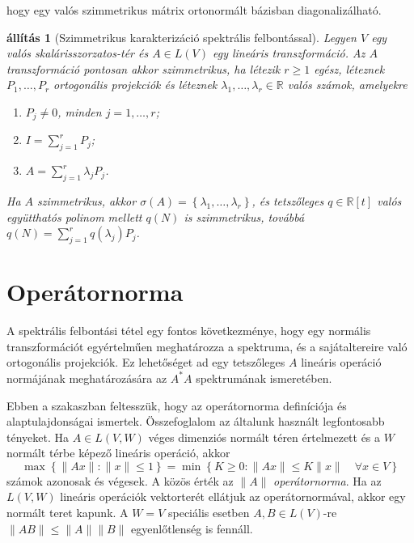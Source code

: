 \documentclass[9pt, a4paper, showtrims]{memoir}
\theoremstyle{plain}
\newtheorem{proposition}{állítás}[chapter]
\theoremstyle{remark}
\theoremstyle{definition}
\begin{document}
hogy egy valós szimmetrikus mátrix ortonormált bázisban diagonalizálható.
\begin{proposition}[Szimmetrikus karakterizáció spektrális felbontással]
    Legyen $V$ egy valós ska\-lá\-ris\-szor\-za\-tos-tér 
    és $A\in L\left( V \right)$ egy lineáris transzformáció.
    Az $A$ transzformáció pontosan akkor szimmetrikus,
    ha létezik $r\geq 1$ egész, léteznek $P_1,\dots,P_r$ ortogonális projekciók és
    léteznek $\lambda_1,\dots,\lambda_r\in\mathbb{R}$ valós számok,
    amelyekre
    \begin{enumerate}
        \item $P_j\neq 0$, minden $j=1,\dots,r$;
        \item $I=\sum_{j=1}^rP_j$;
        \item $A=\sum_{j=1}^r\lambda_jP_j$.
    \end{enumerate}
    Ha $A$ szimmetrikus, 
    akkor $\sigma\left( A \right)=\left\{ \lambda_1,\dots,\lambda_r \right\}$,
    és tetszőleges $q\in\mathbb{R}[t]$ valós együtthatós polinom mellett
    $q\left( N \right)$ is szimmetrikus, 
    továbbá
    $q\left( N \right)=\sum_{j=1}^rq\left( \lambda_j \right)P_j$.
\end{proposition}




\section{Operátornorma}
A spektrális felbontási tétel egy fontos következménye, 
hogy egy normális transzformációt egyértelműen meghatározza a spektruma, és a sajátaltereire való
ortogonális projekciók.
Ez lehetőséget ad egy tetszőleges $A$ lineáris operáció normájának meghatározására az $A^\ast A$ spektrumának ismeretében.

Ebben a szakaszban feltesszük,
hogy az operátornorma definíciója és alaptulajdonságai ismertek.
Összefoglalom az általunk használt legfontosabb tényeket.
Ha $A\in L\left( V,W \right)$ véges dimenziós normált téren értelmezett és a $W$ normált térbe képező lineáris operáció,
akkor 
\[
    \max\left\{ \|Ax\|:\|x\|\leq 1 \right\}
    =
    \min\left\{ K\geq 0:\|Ax\|\leq K\|x\|\quad\forall x\in V \right\}
\]
számok azonosak és végesek. A közös érték az $\|A\|$ \emph{operátornorma}. 
Ha az $L\left( V,W \right)$ lineáris operációk vektorterét ellátjuk az operátornormával,
akkor egy normált teret kapunk.
A $W=V$ speciális esetben $A,B\in L\left( V \right)$-re $\|AB\|\leq \|A\|\|B\|$ egyenlőtlenség is fennáll.
\end{document}
